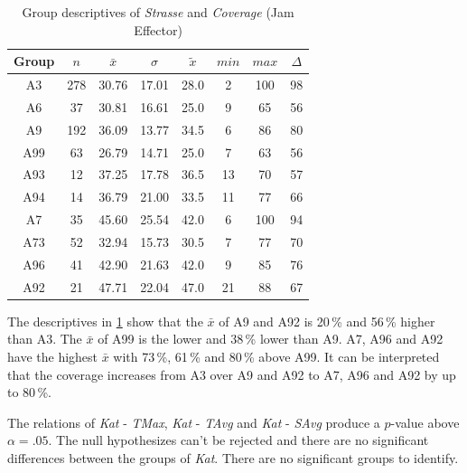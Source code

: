 \begin{table}[ht]
	\tiny
	\centering
	\begin{tabular}{c|c|c|c|c|c|c|c}
		\toprule
		Group & $n$ & $\bar{x}$ & $\sigma$ & $\tilde{x}$ & $min$ & $max$ & $\Delta$ \\
		\midrule
		A3   & 278 & 30.76 & 17.01 & 28.0 & 2  & 100 & 98 \\ 
		A6   & 37  & 30.81 & 16.61 & 25.0 & 9  & 65  & 56 \\ 
		A9   & 192 & 36.09 & 13.77 & 34.5 & 6  & 86  & 80 \\ 
		A99  & 63  & 26.79 & 14.71 & 25.0 & 7  & 63  & 56 \\ 
		A93  & 12  & 37.25 & 17.78 & 36.5 & 13 & 70  & 57 \\ 
		A94  & 14  & 36.79 & 21.00 & 33.5 & 11 & 77  & 66 \\ 
		A7   & 35  & 45.60 & 25.54 & 42.0 & 6  & 100 & 94 \\ 
		A73  & 52  & 32.94 & 15.73 & 30.5 & 7  & 77  & 70 \\ 
		A96  & 41  & 42.90 & 21.63 & 42.0 & 9  & 85  & 76 \\ 
		A92  & 21  & 47.71 & 22.04 & 47.0 & 21 & 88  & 67 \\ 
		\bottomrule
	  \end{tabular}
    \caption{Group descriptives of \textit{Strasse} and \textit{Coverage} (Jam Effector)}
    \label{tbl:descriptives_baysis_effector_Strasse_Cov}
\end{table}
The descriptives in \cref{tbl:descriptives_baysis_effector_Strasse_Cov} show that the $\bar{x}$ of A9 and A92 is 20\,\% and 56\,\% higher than A3. The $\bar{x}$ of A99 is the lower and 38\,\% lower than A9. A7, A96 and A92 have the highest $\bar{x}$ with 73\,\%, 61\,\% and 80\,\% above A99. It can be interpreted that the coverage increases from A3 over A9 and A92 to A7, A96 and A92 by up to 80\,\%.

\clearpage

The relations of \textit{Kat} - \textit{TMax}, \textit{Kat} - \textit{TAvg} and \textit{Kat} - \textit{SAvg} produce a $p$-value above $\alpha=.05$. The null hypothesizes can't be rejected and there are no significant differences between the groups of \textit{Kat}. There are no significant groups to identify.

